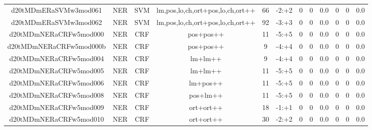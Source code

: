\documentclass[a4paper]{article}
\begin{document}
\begin{landscape}
\begin{center}
\begin{tabular}{ |c|c|c|c|c|c|c|c|c|c|c|c|}
 	\small{ d20tMDmERaSVMw3mod061 } & \small{ NER} & \small{  SVM }  & lm,pos,lo,ch,ort+pos,lo,ch,ort++  &  66 &  \small{  -2:+2 }  &  0 & 0 & 0.0  &  0 & 0 & 0.0 \\
 	

 
 	
 	\small{ d20tMDmERaSVMw3mod062 } & \small{ NER} & \small{  SVM }  & lm,pos,lo,ch,ort+pos,lo,ch,ort++  &  92 &  \small{  -3:+3 }  &  0 & 0 & 0.0  &  0 & 0 & 0.0 \\
 	

 
 	
 	\small{ d20tMDmNERaCRFw5mod000 } & \small{ NER} & \small{  CRF }  & pos+pos++  &  11 &  \small{  -5:+5 }  &  0 & 0 & 0.0  &  0 & 0 & 0.0 \\
 	

 
 	
 	\small{ d20tMDmNERaCRFw5mod000b } & \small{ NER} & \small{  CRF }  & pos+pos++  &  9 &  \small{  -4:+4 }  &  0 & 0 & 0.0  &  0 & 0 & 0.0 \\
 	

 
 	
 	\small{ d20tMDmNERaCRFw5mod004 } & \small{ NER} & \small{  CRF }  & lm+lm++  &  9 &  \small{  -4:+4 }  &  0 & 0 & 0.0  &  0 & 0 & 0.0 \\
 	

 
 	
 	\small{ d20tMDmNERaCRFw5mod005 } & \small{ NER} & \small{  CRF }  & lm+lm++  &  11 &  \small{  -5:+5 }  &  0 & 0 & 0.0  &  0 & 0 & 0.0 \\
 	

 
 	
 	\small{ d20tMDmNERaCRFw5mod006 } & \small{ NER} & \small{  CRF }  & lm+pos++  &  11 &  \small{  -5:+5 }  &  0 & 0 & 0.0  &  0 & 0 & 0.0 \\
 	

 
 	
 	\small{ d20tMDmNERaCRFw5mod008 } & \small{ NER} & \small{  CRF }  & pos+lm++  &  11 &  \small{  -5:+5 }  &  0 & 0 & 0.0  &  0 & 0 & 0.0 \\
 	

 
 	
 	\small{ d20tMDmNERaCRFw5mod009 } & \small{ NER} & \small{  CRF }  & ort+ort++  &  18 &  \small{  -1:+1 }  &  0 & 0 & 0.0  &  0 & 0 & 0.0 \\
 	

 
 	
 	\small{ d20tMDmNERaCRFw5mod010 } & \small{ NER} & \small{  CRF }  & ort+ort++  &  30 &  \small{  -2:+2 }  &  0 & 0 & 0.0  &  0 & 0 & 0.0 \\
 	


\end{tabular}
\end{center}
\end{landscape}
\end{document}
